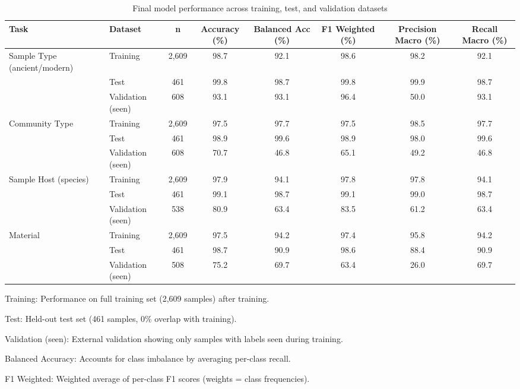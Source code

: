 \begin{table}[!t]
\caption{Final model performance across training, test, and validation datasets\label{tab:performance_summary}}
\begin{tabular*}{\textwidth}{@{\extracolsep{\fill}}llcccccc@{\extracolsep{\fill}}}
\toprule
Task & Dataset & n & Accuracy (\%) & Balanced Acc (\%) & F1 Weighted (\%) & Precision Macro (\%) & Recall Macro (\%) \\
\midrule
Sample Type (ancient/modern) & Training & 2,609 & 98.7 & 92.1 & 98.6 & 98.2 & 92.1 \\
 & Test & 461 & 99.8 & 98.7 & 99.8 & 99.9 & 98.7 \\
 & Validation (seen) & 608 & 93.1 & 93.1 & 96.4 & 50.0 & 93.1 \\
\addlinespace
Community Type & Training & 2,609 & 97.5 & 97.7 & 97.5 & 98.5 & 97.7 \\
 & Test & 461 & 98.9 & 99.6 & 98.9 & 98.0 & 99.6 \\
 & Validation (seen) & 608 & 70.7 & 46.8 & 65.1 & 49.2 & 46.8 \\
\addlinespace
Sample Host (species) & Training & 2,609 & 97.9 & 94.1 & 97.8 & 97.8 & 94.1 \\
 & Test & 461 & 99.1 & 98.7 & 99.1 & 99.0 & 98.7 \\
 & Validation (seen) & 538 & 80.9 & 63.4 & 83.5 & 61.2 & 63.4 \\
\addlinespace
Material & Training & 2,609 & 97.5 & 94.2 & 97.4 & 95.8 & 94.2 \\
 & Test & 461 & 98.7 & 90.9 & 98.6 & 88.4 & 90.9 \\
 & Validation (seen) & 508 & 75.2 & 69.7 & 63.4 & 26.0 & 69.7 \\
\bottomrule
\end{tabular*}
\begin{tablenotes}
\item Training: Performance on full training set (2,609 samples) after training.
\item Test: Held-out test set (461 samples, 0\% overlap with training).
\item Validation (seen): External validation showing only samples with labels seen during training.
\item Balanced Accuracy: Accounts for class imbalance by averaging per-class recall.
\item F1 Weighted: Weighted average of per-class F1 scores (weights = class frequencies).
\end{tablenotes}
\end{table}